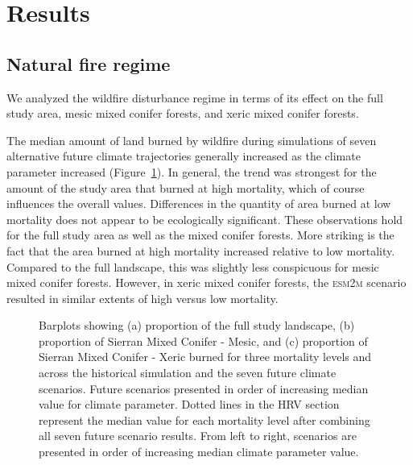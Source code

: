 \section{Results}

\subsection*{Natural fire regime}

We analyzed the wildfire disturbance regime in terms of its effect on the full study area, mesic mixed conifer forests, and xeric mixed conifer forests. 

The median amount of land burned by wildfire during simulations of seven alternative future climate trajectories generally increased as the climate parameter increased (Figure~\ref{fig:dareacomp}). In general, the trend was strongest for the amount of the study area that burned at high mortality, which of course influences the overall values. Differences in the quantity of area burned at low mortality does not appear to be ecologically significant. These observations hold for the full study area as well as the mixed conifer forests. More striking is the fact that the area burned at high mortality increased relative to low mortality. Compared to the full landscape, this was slightly less conspicuous for mesic mixed conifer forests. However, in xeric mixed conifer forests, the \textsc{esm2m} scenario resulted in similar extents of high versus low mortality. 


\begin{figure}[!htbp]
  \centering


    \caption{Barplots showing (a) proportion of the full study landscape, (b) proportion of Sierran Mixed Conifer - Mesic, and (c) proportion of Sierran Mixed Conifer - Xeric burned for three mortality levels and across the historical simulation and the seven future climate scenarios. Future scenarios presented in order of increasing median value for climate parameter. Dotted lines in the HRV section represent the median value for each mortality level after combining all seven future scenario results. From left to right, scenarios are presented in order of increasing median climate parameter value.}
  \label{fig:dareacomp}
\end{figure}

